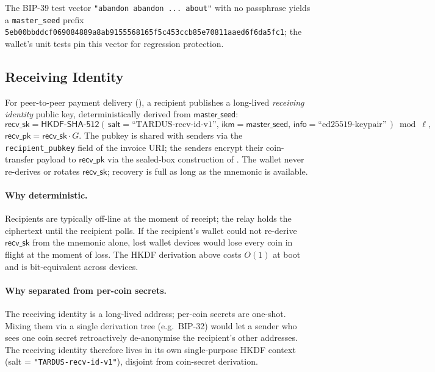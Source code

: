 The BIP-39 test vector \texttt{"abandon abandon ... about"} with no
passphrase yields a \texttt{master\_seed} prefix
\texttt{5eb00bbddcf069084889a8ab9155568165f5c453ccb85e70811aaed6f6da5fc1};
the wallet's unit tests pin this vector for regression protection.

\subsection{Receiving Identity}
\label{sec:wallet-recv-identity}

For peer-to-peer payment delivery (), a recipient
publishes a long-lived \emph{receiving identity} public key,
deterministically derived from $\mathsf{master\_seed}$:
\[
  \mathsf{recv\_sk} = \mathsf{HKDF\text{-}SHA\text{-}512}(\,\mathsf{salt}=\text{``TARDUS-recv-id-v1''},\,
                                                          \mathsf{ikm}=\mathsf{master\_seed},\,
                                                          \mathsf{info}=\text{``ed25519-keypair''}\,)\bmod \ell,
\]
$\mathsf{recv\_pk} = \mathsf{recv\_sk} \cdot G$. The pubkey is shared
with senders via the \texttt{recipient\_pubkey} field of the invoice
URI; the senders encrypt their coin-transfer payload to
$\mathsf{recv\_pk}$ via the sealed-box construction of
. The wallet never re-derives or rotates
$\mathsf{recv\_sk}$; recovery is full as long as the mnemonic is
available.

\paragraph{Why deterministic.} Recipients are typically off-line at the
moment of receipt; the relay holds the ciphertext until the recipient
polls. If the recipient's wallet could not re-derive
$\mathsf{recv\_sk}$ from the mnemonic alone, lost wallet devices would
lose every coin in flight at the moment of loss. The HKDF derivation
above costs $O(1)$ at boot and is bit-equivalent across devices.

\paragraph{Why separated from per-coin secrets.} The receiving
identity is a long-lived address; per-coin secrets are one-shot. Mixing
them via a single derivation tree (e.g.\ BIP-32) would let a sender who
sees one coin secret retroactively de-anonymise the recipient's other
addresses. The receiving identity therefore lives in its own
single-purpose HKDF context (salt = \texttt{"TARDUS-recv-id-v1"}),
disjoint from coin-secret derivation.

